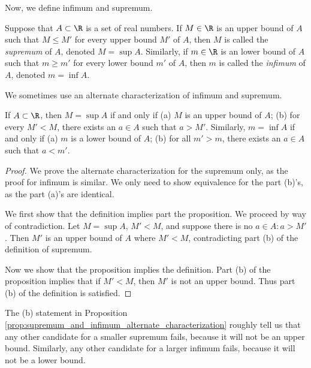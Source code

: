 \documentclass{article} %
\begin{document}
Now, we define infimum and supremum.
\begin{definition}
Suppose that $A \subset \R$ is a set of real numbers. If $M \in \R$ is an upper bound of $A$ such that $M \leq M'$ for every upper bound $M'$ of $A$, then $M$ is called the \textit{supremum} of $A$, denoted $M=\sup A$.   Similarly, if $m \in \R$ is an lower bound of $A$ such that $m \geq m'$ for every lower bound $m'$ of $A$, then $m$ is called the \textit{infimum} of $A$, denoted $m=\inf A$.\label{def:supremum_and_infimum}	
\end{definition}

We sometimes use an alternate characterization of infimum and supremum.

\begin{proposition}

If $A \subset \R$, then $M = \sup A$ if and only if (a) $M$ is an upper bound of $A$; (b) for every $M' < M$, there exists an $a \in A$ such that $a>M'$.  Similarly, $m = \inf A$ if and only if (a) $m$ is a lower bound of $A$; (b) for all $m'>m$, there exists an $a \in A$ such that $a<m'$.

\begin{proof}
We prove the alternate characterization for the supremum only, as the proof for infimum is similar.    We only need to show equivalence for the part (b)'s, as the part (a)'s are identical. 

We first show that the definition implies part the proposition.  We proceed by way of contradiction.  Let $M = \sup A$, $M' <M$, and suppose there is no $a \in A : a > M'$. Then $M'$ is an upper bound of $A$ where $M' <M$, contradicting part (b) of the definition of supremum.   

Now we show that the proposition implies the definition. Part (b) of the proposition implies that if $M' < M$, then $M'$ is not an upper bound. Thus part (b) of the definition is satisfied.
\end{proof}
\label{prop:supremum_and_infimum_alternate_characterization}
\end{proposition}



\begin{remark}
The (b) statement in Proposition \ref{prop:supremum_and_infimum_alternate_characterization} roughly tell us that any other candidate for a smaller supremum fails, because it will not be an upper bound.  Similarly, any other candidate for a larger infimum fails, because it will not be a lower bound. 	
\end{remark}
\end{document}
